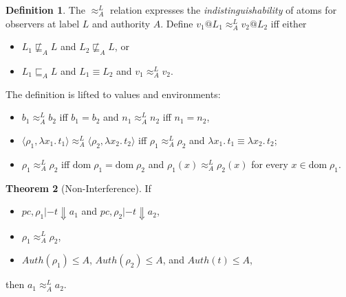 \documentclass{article}
\makeatletter
\newcommand{\at}{\ensuremath{{\scriptstyle{@}}}}
\newcommand{\pc}{\ensuremath{{\mathit{pc}}}}
\theoremstyle{definition}
\newtheorem{theorem}{Theorem}
\newtheorem{definition}[theorem]{Definition}
\makeatother
\begin{document}
\begin{definition}
  The $\approx^{L}_{A}$ relation expresses the \emph{indistinguishability} of
  atoms for observers at label $L$ and authority $A$.
  Define $v_1 \at L_1 \approx^{L}_{A} v_2 \at L_2$ iff either
  \begin{itemize}
  \item $L_1 \not\sqsubseteq_{A} L$ and $L_2 \not\sqsubseteq_{A} L$, or
  \item $L_1 \sqsubseteq_{A} L$ and $L_1 \equiv L_2$ and
    $v_1 \approx^{L}_{A} v_2$.
  \end{itemize}
  The definition is lifted to values and environments:
  \begin{itemize}
  \item
    $b_1 \approx^{L}_{A} b_2$ iff $b_1 = b_2$ and
    $n_1 \approx^{L}_{A} n_2$ iff $n_1 = n_2$,
  \item
    $\langle{\rho_1, \lambda{x_1}.\, t_1\rangle} \approx^{L}_{A}
    \langle{\rho_2, \lambda{x_2}.\, t_2\rangle}$ iff
    $\rho_1 \approx^{L}_{A} \rho_2$ and
    $\lambda{x_1}.\, t_1 \equiv \lambda{x_2}.\, t_2$;
  \item
    $\rho_1 \approx^{L}_{A} \rho_2$ iff
    $\mathrm{dom}\; \rho_1 = \mathrm{dom}\; \rho_2$ and
    $\rho_1(x) \approx^{L}_{A} \rho_2(x)$
    for every $x \in \mathrm{dom}\; \rho_1$.
  \end{itemize}
\end{definition}

\begin{theorem}[Non-Interference]
  If
  \begin{itemize}
  \item $\pc, \rho_1 |- t \Downarrow a_1$ and 
    $\pc, \rho_2 |- t \Downarrow a_2$,
  \item $\rho_1 \approx^{L}_{A} \rho_2$,
  \item $\mathit{Auth}(\rho_1) \leq A$, $\mathit{Auth}(\rho_2) \leq A$, and
    $\mathit{Auth}(t) \leq A$,
  \end{itemize}
  then $a_1 \approx^{L}_{A} a_2$.
\end{theorem}

\end{document}
